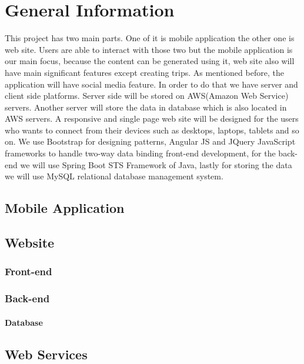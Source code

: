 \chapter{General Information}
This project has two main parts. One of it is mobile application the other one is web site. Users are able to interact with those two but the mobile application is our main focus, because the content can be generated using it, web site also will have main significant features except creating trips.
As mentioned before, the application will have social media feature. In order to do that we have server and client side platforms. Server side will be stored on AWS(Amazon Web Service) servers. Another server will store the data in database which is also located in AWS servers. A responsive and single page web site will be designed for the users who wants to connect from their devices such as desktops, laptops, tablets and so on. We use Bootstrap for designing patterns, Angular JS and JQuery JavaScript frameworks to handle two-way data binding front-end development, for the back-end we will use Spring Boot STS Framework of Java, lastly for storing the data we will use MySQL relational database management system.



\section{Mobile Application}


\section{Website}



\subsection{Front-end}


\subsection{Back-end}

\subsubsection{Database}

\section{Web Services}

